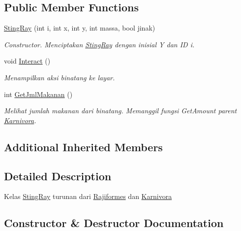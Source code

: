 \subsection*{Public Member Functions}
\begin{DoxyCompactItemize}
\item 
\hyperlink{classStingRay_a30d42cc4678ff7162a98e6e28aabbb8c}{Sting\+Ray} (int i, int x, int y, int massa, bool jinak)
\begin{DoxyCompactList}\small\item\em Constructor. Menciptakan \hyperlink{classStingRay}{Sting\+Ray} dengan inisial \textquotesingle{}Y\textquotesingle{} dan ID i. \end{DoxyCompactList}\item 
void \hyperlink{classStingRay_afb4067196cbbb02297f43fde19cbcfea}{Interact} ()\hypertarget{classStingRay_afb4067196cbbb02297f43fde19cbcfea}{}\label{classStingRay_afb4067196cbbb02297f43fde19cbcfea}

\begin{DoxyCompactList}\small\item\em Menampilkan aksi binatang ke layar. \end{DoxyCompactList}\item 
int \hyperlink{classStingRay_aa1c718c7a2d420cdeac49df66c17ae07}{Get\+Jml\+Makanan} ()
\begin{DoxyCompactList}\small\item\em Melihat jumlah makanan dari binatang. Memanggil fungsi Get\+Amount parent \hyperlink{classKarnivora}{Karnivora}. \end{DoxyCompactList}\end{DoxyCompactItemize}
\subsection*{Additional Inherited Members}


\subsection{Detailed Description}
Kelas \hyperlink{classStingRay}{Sting\+Ray} turunan dari \hyperlink{classRajiformes}{Rajiformes} dan \hyperlink{classKarnivora}{Karnivora} 

\subsection{Constructor \& Destructor Documentation}
